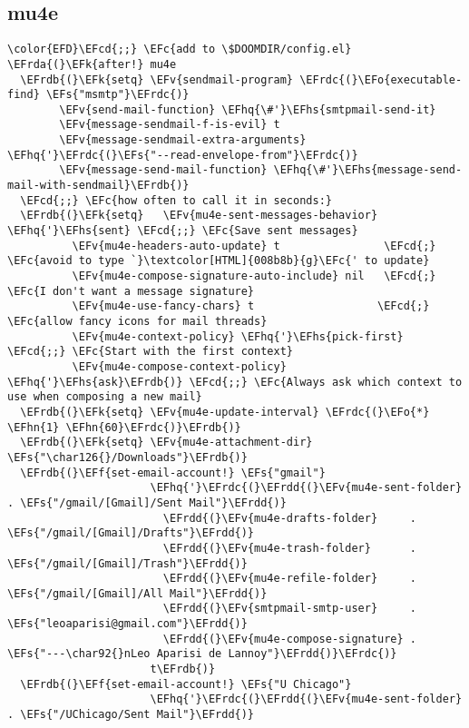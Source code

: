 \documentclass[c]{article}
\theoremstyle{plain}%
\theoremstyle{definition}
\theoremstyle{remark}
\newcommand{\EFc}[1]{\textcolor{EFc}{#1}} %
\newcommand{\EFcd}[1]{\textcolor{EFcd}{#1}} %
\newcommand{\EFs}[1]{\textcolor{EFs}{#1}} %
\newcommand{\EFk}[1]{\textcolor{EFk}{#1}} %
\newcommand{\EFf}[1]{\textcolor{EFf}{#1}} %
\newcommand{\EFv}[1]{\textcolor{EFv}{#1}} %
\newcommand{\EFo}[1]{\textcolor{EFo}{#1}} %
\newcommand{\EFhn}[1]{\textcolor{EFhn}{\textbf{#1}}} %
\newcommand{\EFhq}[1]{\textcolor{EFhq}{#1}} %
\newcommand{\EFhs}[1]{\textcolor{EFhs}{#1}} %
\newcommand{\EFrda}[1]{\textcolor{EFrda}{#1}} %
\newcommand{\EFrdb}[1]{\textcolor{EFrdb}{#1}} %
\newcommand{\EFrdc}[1]{\textcolor{EFrdc}{#1}} %
\newcommand{\EFrdd}[1]{\textcolor{EFrdd}{#1}} %
\begin{document}
\subsection{mu4e}
\label{sec:org6567202}
\begin{Code}
\begin{Verbatim}
\color{EFD}\EFcd{;;} \EFc{add to \$DOOMDIR/config.el}
\EFrda{(}\EFk{after!} mu4e
  \EFrdb{(}\EFk{setq} \EFv{sendmail-program} \EFrdc{(}\EFo{executable-find} \EFs{"msmtp"}\EFrdc{)}
        \EFv{send-mail-function} \EFhq{\#'}\EFhs{smtpmail-send-it}
        \EFv{message-sendmail-f-is-evil} t
        \EFv{message-sendmail-extra-arguments} \EFhq{'}\EFrdc{(}\EFs{"--read-envelope-from"}\EFrdc{)}
        \EFv{message-send-mail-function} \EFhq{\#'}\EFhs{message-send-mail-with-sendmail}\EFrdb{)}
  \EFcd{;;} \EFc{how often to call it in seconds:}
  \EFrdb{(}\EFk{setq}   \EFv{mu4e-sent-messages-behavior} \EFhq{'}\EFhs{sent} \EFcd{;;} \EFc{Save sent messages}
          \EFv{mu4e-headers-auto-update} t                \EFcd{;} \EFc{avoid to type `}\textcolor[HTML]{008b8b}{g}\EFc{' to update}
          \EFv{mu4e-compose-signature-auto-include} nil   \EFcd{;} \EFc{I don't want a message signature}
          \EFv{mu4e-use-fancy-chars} t                   \EFcd{;} \EFc{allow fancy icons for mail threads}
          \EFv{mu4e-context-policy} \EFhq{'}\EFhs{pick-first}   \EFcd{;;} \EFc{Start with the first context}
          \EFv{mu4e-compose-context-policy} \EFhq{'}\EFhs{ask}\EFrdb{)} \EFcd{;;} \EFc{Always ask which context to use when composing a new mail}
  \EFrdb{(}\EFk{setq} \EFv{mu4e-update-interval} \EFrdc{(}\EFo{*} \EFhn{1} \EFhn{60}\EFrdc{)}\EFrdb{)}
  \EFrdb{(}\EFk{setq} \EFv{mu4e-attachment-dir} \EFs{"\char126{}/Downloads"}\EFrdb{)}
  \EFrdb{(}\EFf{set-email-account!} \EFs{"gmail"}
                      \EFhq{'}\EFrdc{(}\EFrdd{(}\EFv{mu4e-sent-folder}       . \EFs{"/gmail/[Gmail]/Sent Mail"}\EFrdd{)}
                        \EFrdd{(}\EFv{mu4e-drafts-folder}     . \EFs{"/gmail/[Gmail]/Drafts"}\EFrdd{)}
                        \EFrdd{(}\EFv{mu4e-trash-folder}      . \EFs{"/gmail/[Gmail]/Trash"}\EFrdd{)}
                        \EFrdd{(}\EFv{mu4e-refile-folder}     . \EFs{"/gmail/[Gmail]/All Mail"}\EFrdd{)}
                        \EFrdd{(}\EFv{smtpmail-smtp-user}     . \EFs{"leoaparisi@gmail.com"}\EFrdd{)}
                        \EFrdd{(}\EFv{mu4e-compose-signature} . \EFs{"---\char92{}nLeo Aparisi de Lannoy"}\EFrdd{)}\EFrdc{)}
                      t\EFrdb{)}
  \EFrdb{(}\EFf{set-email-account!} \EFs{"U Chicago"}
                      \EFhq{'}\EFrdc{(}\EFrdd{(}\EFv{mu4e-sent-folder}       . \EFs{"/UChicago/Sent Mail"}\EFrdd{)}

\end{Verbatim}
\end{Code}
\end{document}
